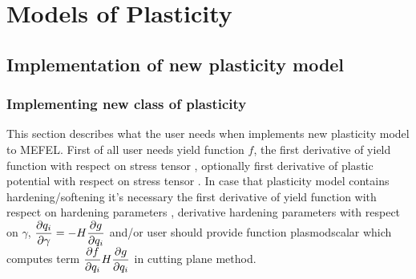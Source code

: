 

\section{Models of Plasticity}
\subsection{Implementation of new plasticity model}
\subsubsection {Implementing new class of plasticity}
This section describes what the user needs when implements new plasticity model
to MEFEL. First of all user needs yield function $f$, the first derivative of yield function with
respect on stress tensor , optionally first derivative of plastic potential
with respect on stress tensor . In case that plasticity model
contains hardening/softening it's necessary the first derivative of yield function with
respect on hardening parameters , derivative hardening parameters with respect
on $\gamma$, $\mbox{$\displaystyle\frac{\partial{q_i}}{\partial{\gamma}}$}=-H\mbox{$\displaystyle\frac{\partial{g}}{\partial{q_i}}$}$ and/or user should provide function {\sf plasmodscalar}
which computes term $\mbox{$\displaystyle\frac{\partial{f}}{\partial{q_i}}$}H\mbox{$\displaystyle\frac{\partial{g}}{\partial{q_i}}$}$ in cutting plane method.

